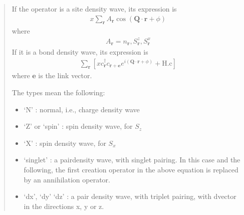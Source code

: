 \documentclass[letterpaper,10pt,english]{sphinxmanual}
\begin{document}
\label{\detokenize{models:density-waves}}\label{\detokenize{models:density-wave-theory}}\begin{quote}

\sphinxAtStartPar
If the operator is a site density wave, its expression is
\begin{equation*}
\begin{split}x\sum_\mathbf{r} A_\mathbf{r} \cos(\mathbf{Q}\cdot\mathbf{r}+\phi)\end{split}
\end{equation*}
\sphinxAtStartPar
where
\begin{equation*}
\begin{split}A_{\mathbf{r}} = n_{\mathbf{r}}, S^{z}_\mathbf{r}, S^{x}_\mathbf{r}\end{split}
\end{equation*}
\sphinxAtStartPar
If it is a bond density wave, its expression is
\begin{equation*}
\begin{split}\sum_{\mathbf{r}} \left[ x c_\mathbf{r}^\dagger c_{\mathbf{r}+\mathbf{e}} e^{i(\mathbf{Q}\cdot\mathbf{r}+\phi)} + \mathrm{H.c} \right]\end{split}
\end{equation*}
\sphinxAtStartPar
where \(\mathbf{e}\) is the link vector.

\sphinxAtStartPar
The types mean the following:
\begin{itemize}
\item {} 
\sphinxAtStartPar
‘N’ : normal, i.e., charge density wave

\item {} 
\sphinxAtStartPar
‘Z’ or ‘spin’ : spin density wave, for \(S_z\)

\item {} 
\sphinxAtStartPar
‘X’ : spin density wave, for \(S_x\)

\item {} 
\sphinxAtStartPar
‘singlet’ : a pair\sphinxhyphen{}density wave, with singlet pairing. In this case and the following, the first creation operator in the above equation is replaced by an annihilation operator.

\item {} 
\sphinxAtStartPar
‘dx’, ‘dy’ ‘dz’ : a pair density wave, with triplet pairing, with d\sphinxhyphen{}vector in the directions x, y or z.

\end{itemize}
\end{quote}
\end{document}
